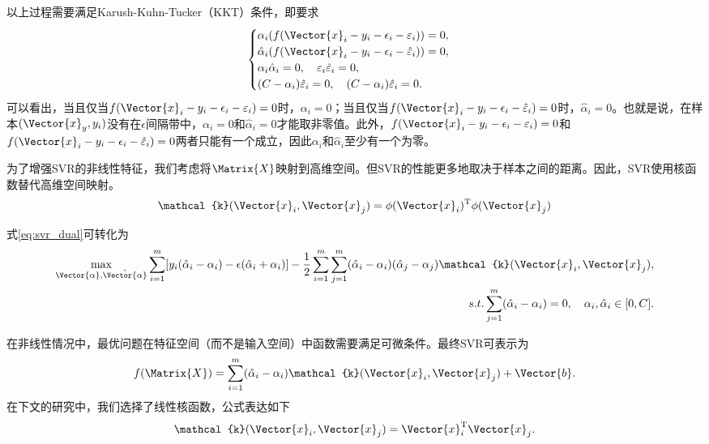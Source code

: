 以上过程需要满足Karush-Kuhn-Tucker（KKT）条件，即要求
\begin{equation}
  \label{eq:svr_kkt}
  \begin{cases}
    \alpha_i(f(\Vector{x}_i-y_i-\epsilon_i-\varepsilon_i))=0,\\
    \hat{\alpha}_i(f(\Vector{x}_i-y_i-\epsilon_i-\hat{\varepsilon}_i))=0,\\
    \alpha_i\hat{\alpha}_i=0,\quad  \varepsilon_i\hat{\varepsilon}_i=0,\\
    (C-\alpha_i)\hat{\varepsilon}_i=0,\quad  (C-\alpha_i)\hat{\varepsilon}_i=0.
  \end{cases}
\end{equation}
可以看出，当且仅当$f(\Vector{x}_i-y_i-\epsilon_i-\varepsilon_i)=0$时，$\alpha_i=0$；当且仅当$f(\Vector{x}_i-y_i-\epsilon_i-\hat{\varepsilon}_i)=0$时，$\hat{\alpha}_i=0$。也就是说，在样本$(\Vector{x}_y,y_i)$没有在$\epsilon$间隔带中，$\alpha_i=0$和$\hat{\alpha}_i=0$才能取非零值。此外，$f(\Vector{x}_i-y_i-\epsilon_i-\varepsilon_i)=0$和$f(\Vector{x}_i-y_i-\epsilon_i-\hat{\varepsilon}_i)=0$两者只能有一个成立，因此$\alpha_i$和$\hat{\alpha}_i$至少有一个为零。

为了增强SVR的非线性特征，我们考虑将$\Matrix{X}$映射到高维空间。但SVR的性能更多地取决于样本之间的距离。因此，SVR使用核函数替代高维空间映射。
\begin{equation}
  \label{eq:svr_kernel}
   \mathcal{k}(\Vector{x}_i,\Vector{x}_j)=\phi(\Vector{x}_i)^{\text{T}}\phi(\Vector{x}_j)
\end{equation}

式\ref{eq:svr_dual}可转化为
\begin{equation}
  \label{eq:svr_dual_kernel}
  \begin{split}
  \max\limits_{\Vector{\alpha},\hat{\Vector{\alpha}}}\sum_{i=1}^{m}[y_i(\hat{\alpha}_i-\alpha_i)-\epsilon(\hat{\alpha}_i+\alpha_i)]-\frac{1}{2}\sum_{i=1}^{m}\sum_{j=1}^{m}(\hat{\alpha}_i-\alpha_i)(\hat{\alpha}_j-\alpha_j)\mathcal{k}(\Vector{x}_i,\Vector{x}_j),\\
  s.t. 
  \sum_{j=1}^{m}(\hat{\alpha}_i-\alpha_i)=0, \quad \alpha_i, \hat{\alpha}_i\in[0,C].
  \end{split}
\end{equation}

在非线性情况中，最优问题在特征空间（而不是输入空间）中函数需要满足可微条件。最终SVR可表示为
\begin{equation}
  \label{eq:svr_kernel_v2}
  f(\Matrix{X})=\sum_{i=1}^{m}(\hat{\alpha}_i-\alpha_i)\mathcal{k}(\Vector{x}_i,\Vector{x}_j)+\Vector{b}.
\end{equation}
在下文的研究中，我们选择了线性核函数，公式表达如下
\begin{equation}
  \label{eq:svr_kernel_linear}
  \mathcal{k}(\Vector{x}_i,\Vector{x}_j)=\Vector{x}_i^{\text{T}}\Vector{x}_j.
\end{equation}




